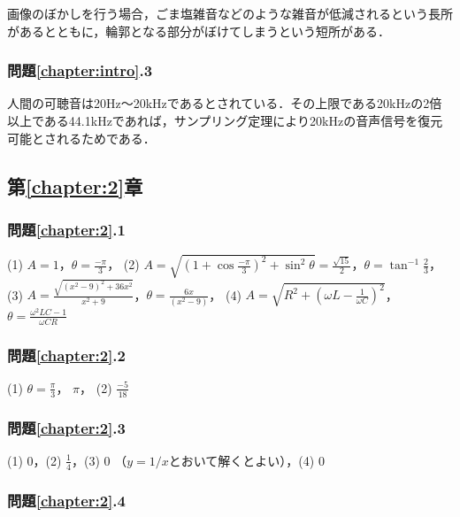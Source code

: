 画像のぼかしを行う場合，ごま塩雑音などのような雑音が低減されるという長所があるとともに，輪郭となる部分がぼけてしまうという短所がある．

\subsubsection*{問題\ref{chapter:intro}.3}

人間の可聴音は20Hz～20kHzであるとされている．その上限である20kHzの2倍以上である44.1kHzであれば，サンプリング定理により20kHzの音声信号を復元可能とされるためである．

\subsection*{第\ref{chapter:2}章}

\subsubsection*{問題\ref{chapter:2}.1}

\noindent (1) $A=1$，$\theta=\displaystyle \frac{-\pi}{3}$，
(2) $A=\sqrt{(1+\displaystyle \cos \frac{-\pi}{3})^2+\sin^2 \theta}=\displaystyle \frac{\sqrt{15}}{2}$，$\theta=\tan^{-1}\displaystyle \frac{2}{3}$，\\
(3) $A=\displaystyle \frac{\sqrt{(x^2-9)^2 + 36x^2}}{x^2+9}$，$\theta=\displaystyle \frac{6x}{(x^2-9)}$，
(4) $A=\displaystyle \sqrt{ R^2+ \left( \omega L - \frac{1}{\omega C} \right)^2}$，$\theta=\displaystyle \frac{\omega^2 LC -1}{\omega CR}$

\subsubsection*{問題\ref{chapter:2}.2}

\noindent (1) $\theta=\displaystyle \frac{\pi}{3}$， $\pi$，
\noindent (2) $\displaystyle \frac{-5}{18}$

\subsubsection*{問題\ref{chapter:2}.3}

\noindent (1) 0，(2) $\displaystyle \frac{1}{4}$，(3) 0 （$y=1/x$とおいて解くとよい），(4) 0

\subsubsection*{問題\ref{chapter:2}.4}

